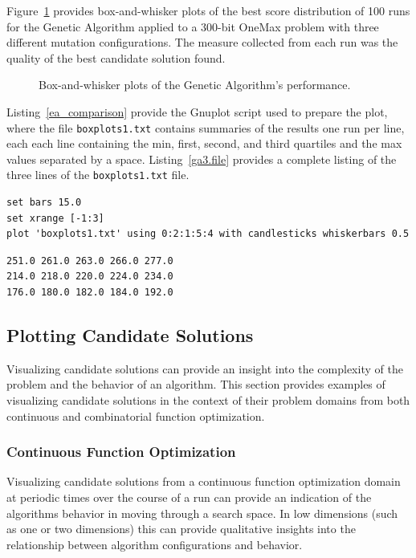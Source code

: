 Figure~\ref{plot:ga3} provides box-and-whisker plots of the best score distribution of 100 runs for the Genetic Algorithm applied to a 300-bit OneMax problem with three different mutation configurations. The measure collected from each run was the quality of the best candidate solution found. 

\begin{figure}[htp]
\centering

\caption{Box-and-whisker plots of the Genetic Algorithm's performance.}
\label{plot:ga3}
\end{figure}

Listing~\ref{ea_comparison} provide the Gnuplot script used to prepare the plot, where the file \texttt{boxplots1.txt} contains summaries of the results one run per line, each each line containing the min, first, second, and third quartiles and the max values separated by a space. Listing~\ref{ga3.file} provides a complete listing of the three lines of the \texttt{boxplots1.txt} file.

\begin{lstlisting}[caption=Gnuplot script for creating a Box-and-whisker plot., label=ea_comparison]
set bars 15.0
set xrange [-1:3]
plot 'boxplots1.txt' using 0:2:1:5:4 with candlesticks whiskerbars 0.5
\end{lstlisting}

\begin{lstlisting}[caption=Complete listing of the \texttt{boxplots1.txt} file., label=ga3.file]
251.0 261.0 263.0 266.0 277.0
214.0 218.0 220.0 224.0 234.0
176.0 180.0 182.0 184.0 192.0
\end{lstlisting}

%
%
\subsection{Plotting Candidate Solutions}
Visualizing candidate solutions can provide an insight into the complexity of the problem and the behavior of an algorithm.  This section provides examples of visualizing candidate solutions in the context of their problem domains from both continuous and combinatorial function optimization.

\subsubsection{Continuous Function Optimization}
Visualizing candidate solutions from a continuous function optimization domain at periodic times over the course of a run can provide an indication of the algorithms behavior in moving through a search space. In low dimensions (such as one or two dimensions) this can provide qualitative insights into the relationship between algorithm configurations and behavior.

